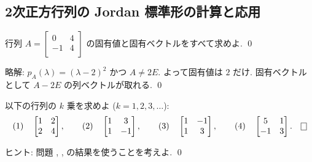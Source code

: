 \documentclass[12pt,twoside]{jarticle}
\newcommand\commentout[1]{#1}
\newcommand\commentout[1]{}
\begin{document}

\subsection{2次正方行列の Jordan 標準形の計算と応用}
\label{sec:2x2-calc-app}


\begin{question}
\label{q:[0,4;-1,4]]}
  行列 %
  \(
    A =
    \begin{bmatrix}
       0 & 4 \\
      -1 & 4 \\
    \end{bmatrix}
  \) の固有値と固有ベクトルをすべて求めよ. \qed
\end{question}

\commentout{
\noindent
略解: $p_A(\lambda)=(\lambda-2)^2$ かつ $A\ne 2E$. 
よって固有値は $2$ だけ. 固有ベクトルとして $A - 2E$ の列ベクトルが取れる.
\qed
}


\begin{question}
\label{q:k-jou}
  以下の行列の $k$ 乗を求めよ ($k=1,2,3,\ldots$):
  \begin{equation*}
    \text{(1)}\quad
    \begin{bmatrix} 1 & 2 \\ 2 & 4 \end{bmatrix},
    \qquad
    \text{(2)}\quad
    \begin{bmatrix} 1 & 3 \\ 1 & -1 \end{bmatrix},
    \qquad
    \text{(3)}\quad
    \begin{bmatrix} 1 & - 1 \\ 1 & 3 \end{bmatrix},
    \qquad
    \text{(4)}\quad
    \begin{bmatrix} 5 & 1 \\ -1 & 3 \end{bmatrix}.
    \qed
  \end{equation*}
\end{question}

\noindent 
ヒント: 問題 , , 
 の結果を使うことを考えよ.
\qed
\end{document}
